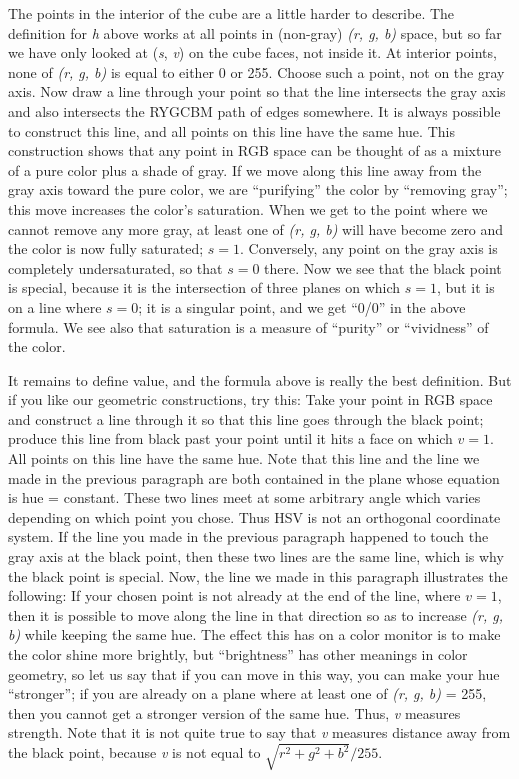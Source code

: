 The points in the interior of the cube are a little harder to describe.
The definition for {\it h} above works at all points in (non-gray)
{\it (r, g, b)} space, but so far we have only looked at ({\it s},
{\it v}) on the cube faces, not inside it.  At interior points, none
of {\it (r, g, b)} is equal to either 0 or 255.  Choose such a point,
not on the gray axis.  Now draw a line through your point so that the
line intersects the gray axis and also intersects the RYGCBM path of
edges somewhere.  It is always possible to construct this line, and
all points on this line have the same hue.  This construction shows
that any point in RGB space can be thought of as a mixture of a pure
color plus a shade of gray.  If we move along this line away from the
gray axis toward the pure color, we are ``purifying'' the color by
``removing gray''; this move increases the color's saturation.  When
we get to the point where we cannot remove any more gray, at least one
of {\it (r, g, b)} will have become zero and the color is now fully
saturated; $s = 1$.  Conversely, any point on the gray axis is
completely undersaturated, so that $s = 0$ there.  Now we see that
the black point is special, because it is the intersection of three
planes on which $s = 1$, but it is on a line where $s = 0$; it is a
singular point, and we get ``0/0'' in the above formula.  We see also
that saturation is a measure of ``purity'' or ``vividness'' of the
color.

It remains to define value, and the formula above is really the best
definition.  But if you like our geometric constructions, try this:
Take your point in RGB space and construct a line through it so that
this line goes through the black point; produce this line from black
past your point until it hits a face on which $v = 1$.  All points
on this line have the same hue.  Note that this line and the line we
made in the previous paragraph are both contained in the plane whose
equation is hue = constant.  These two lines meet at some arbitrary
angle which varies depending on which point you chose.  Thus HSV is
not an orthogonal coordinate system.  If the line you made in the
previous paragraph happened to touch the gray axis at the black point,
then these two lines are the same line, which is why the black point
is special.  Now, the line we made in this paragraph illustrates the
following:  If your chosen point is not already at the end of the
line, where $v = 1$, then it is possible to move along the line in
that direction so as to increase {\it (r, g, b)} while keeping the
same hue.  The effect this has on a color monitor is to make the
color shine more brightly, but ``brightness'' has other meanings in
color geometry, so let us say that if you can move in this way, you
can make your hue ``stronger''; if you are already on a plane where
at least one of {\it (r, g, b)} = 255, then you cannot get a stronger
version of the same hue.  Thus, {\it v} measures strength.  Note that
it is not quite true to say that {\it v} measures distance away from
the black point, because {\it v} is not equal to $\sqrt{r^2 + g^2 + b^2}/255$.

